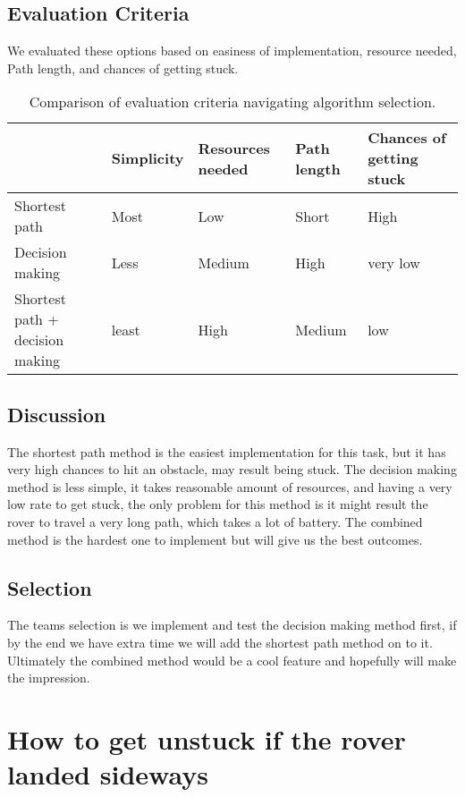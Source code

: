 \documentclass[10pt,letterpaper,onecolumn,journal]{IEEEtran}
\begin{document}
\subsection{Evaluation Criteria}
We evaluated these options based on easiness of implementation, resource needed, Path length, and chances of getting stuck. 

\begin{table}[h!]
	\centering
	\caption{Comparison of evaluation criteria navigating algorithm selection.}
	\label{tab:table1}
	\begin{tabular}{l|l|l|l|l}
		& Simplicity  &Resources needed   & Path length & Chances of getting stuck  \\
		\hline
		Shortest path          	& Most      	& Low			 & Short  & High \\
		\hline
		Decision making        	& Less       	&Medium   	     & High  & very low \\
		\hline
		Shortest path + decision making& least     	& High           & Medium    &  low	\\
	\end{tabular}
\end{table}

\subsection{Discussion}
The shortest path method is the easiest implementation for this task, but it has very high chances to hit an obstacle, may result being stuck. The decision making method is less simple, it takes reasonable amount of resources, and having a very low rate to get stuck, the only problem for this method is it might result the rover to travel a very long path, which takes a lot of battery. The combined method is the hardest one to implement but will give us the best outcomes. 

\subsection{Selection}
The teams selection is we implement and test the decision making method first, if by the end we have extra time we will add the shortest path method on to it. Ultimately the combined method would be a cool feature and hopefully will make the impression. 

\section{How to get unstuck if the rover landed sideways}
\end{document}
